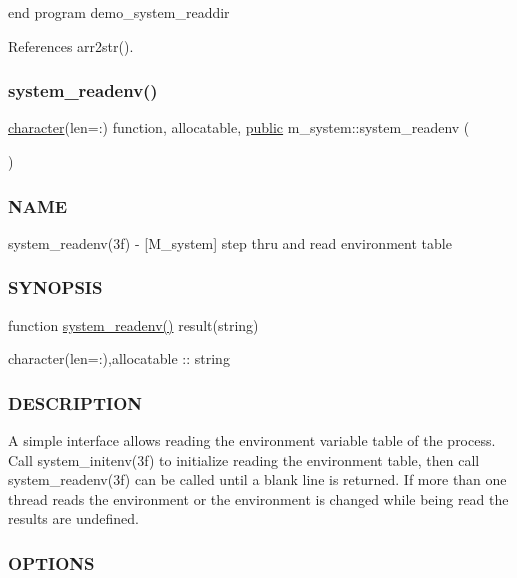 end program demo\+\_\+system\+\_\+readdir 

References arr2str().

\mbox{\label{namespacem__system_ae0e43010a82a6a25402568ccb326322d}} 
\subsubsection{\texorpdfstring{system\+\_\+readenv()}{system\_readenv()}}
{\footnotesize\ttfamily \hyperlink{option__stopwatch_83_8txt_abd4b21fbbd175834027b5224bfe97e66}{character}(len=\+:) function, allocatable, \hyperlink{M__stopwatch_83_8txt_a2f74811300c361e53b430611a7d1769f}{public} m\+\_\+system\+::system\+\_\+readenv (\begin{DoxyParamCaption}{ }\end{DoxyParamCaption})}



\subsubsection*{N\+A\+ME}

system\+\_\+readenv(3f) -\/ \mbox{[}M\+\_\+system\mbox{]} step thru and read environment table \subsubsection*{S\+Y\+N\+O\+P\+S\+IS}

function \hyperlink{namespacem__system_ae0e43010a82a6a25402568ccb326322d}{system\+\_\+readenv()} result(string)

character(len=\+:),allocatable \+:\+: string \subsubsection*{D\+E\+S\+C\+R\+I\+P\+T\+I\+ON}

A simple interface allows reading the environment variable table of the process. Call system\+\_\+initenv(3f) to initialize reading the environment table, then call system\+\_\+readenv(3f) can be called until a blank line is returned. If more than one thread reads the environment or the environment is changed while being read the results are undefined. \subsubsection*{O\+P\+T\+I\+O\+NS}

